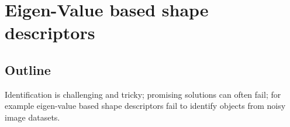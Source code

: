 \documentclass {udthesis}
\begin{document}

\chapter{Eigen-Value based shape descriptors}


\section{Outline}
Identification is challenging and tricky; promising solutions can often fail; for example eigen-value based shape descriptors fail to identify objects from noisy image datasets.
\end{document}
